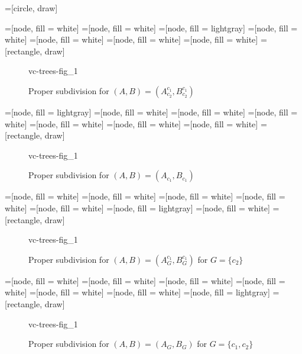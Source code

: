 
	=[circle, draw]

	=[node, fill = white]
	=[node, fill = white]
	=[node, fill = lightgray]
	=[node, fill = white]
	=[node, fill = white]
	=[node, fill = white]
	=[node, fill = white]
	=[rectangle, draw]

	\begin{figure}[p]
		 {vc-trees-fig_1}
		\caption{Proper subdivision for $(A, B) = (A^{c_1}_{c_2}, B^{c_1}_{c_2})$}
	\end{figure}
	
	=[node, fill = lightgray]
	=[node, fill = white]
	=[node, fill = white]
	=[node, fill = white]
	=[node, fill = white]
	=[node, fill = white]
	=[node, fill = white]
	=[rectangle, draw]

	\begin{figure}[p]
		 {vc-trees-fig_1}
		\caption{Proper subdivision for $(A, B) = (A_{c_1}, B_{c_1})$}
	\end{figure}

	=[node, fill = white]
	=[node, fill = white]
	=[node, fill = white]
	=[node, fill = white]
	=[node, fill = white]
	=[node, fill = lightgray]
	=[node, fill = white]
	=[rectangle, draw]

	\begin{figure}[p]
		 {vc-trees-fig_1}
		\caption{Proper subdivision for $(A, B) = (A^{c_1}_G, B^{c_1}_G)$ for $G = \{c_2\}$}
	\end{figure}

	=[node, fill = white]
	=[node, fill = white]
	=[node, fill = white]
	=[node, fill = white]
	=[node, fill = white]
	=[node, fill = white]
	=[node, fill = lightgray]
	=[rectangle, draw]

	\begin{figure}[p]
		 {vc-trees-fig_1}
		\caption{Proper subdivision for $(A, B) = (A_G, B_G)$ for $G = \{c_1, c_2\}$}
	\end{figure}
